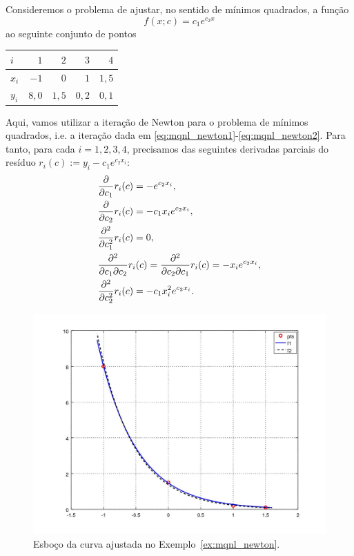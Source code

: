 \begin{ex}\label{ex:mqnl_newton}
  Consideremos o problema de ajustar, no sentido de mínimos quadrados, a função
  \begin{equation}
    f(x;c) = c_1e^{c_2x}
  \end{equation}
ao seguinte conjunto de pontos
\begin{center}
  \begin{tabular}{l|rrrr}
    $i$ & $1$ & $2$ & $3$ & $4$ \\\hline
    $x_i$ & $-1$ & $0$ & $1$ & $1,5$\\
    $y_i$ & $8,0$ & $1,5$ & $0,2$ & $0,1$\\\hline
  \end{tabular}
\end{center}

Aqui, vamos utilizar a iteração de Newton para o problema de mínimos quadrados, i.e. a iteração dada em \eqref{eq:mqnl_newton1}-\eqref{eq:mqnl_newton2}. Para tanto, para cada $i=1, 2, 3, 4$, precisamos das seguintes derivadas parciais do resíduo $r_i(c) := y_i - c_1e^{c_2x_i}$:
\begin{align}
  &\frac{\partial}{\partial c_1}r_i(c) = - e^{c_2x_i},\\
  &\frac{\partial}{\partial c_2}r_i(c) = - c_1x_ie^{c_2x_i},\\
  &\frac{\partial^2}{\partial c_1^2}r_i(c) = 0,\\
  &\frac{\partial^2}{\partial c_1\partial c_2}r_i(c) = \frac{\partial^2}{\partial c_2\partial c_1}r_i(c) = - x_ie^{c_2x_i},\\
  &\frac{\partial^2}{\partial c_2^2}r_i(c) = - c_1x_i^2e^{c_2x_i}.
\end{align}

\begin{figure}[h]
  \centering
  \includegraphics[width=\textwidth]{cap_ajuste/figs/ex_mqnl_N/ex_mqnl_N}
  \caption{Esboço da curva ajustada no Exemplo~\ref{ex:mqnl_newton}.}
  \label{fig:ex_mqnl_newton}
\end{figure}


\end{ex}

